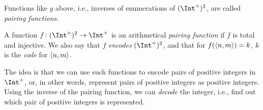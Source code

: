 \documentclass[../../../include/open-logic-section]{subfiles}
\begin{document}
Functions like $g$ above, i.e., inverses of enumerations of $(\Int^+)^2$, are called \emph{pairing functions}.

\begin{defn}
A function $f\colon (\Int^+)^2 \to \Int^+$ is an arithmetical \emph{pairing function} if $f$ is total and injective. We also say that $f$ \emph{encodes} $(\Int^+)^2$, and that for $f(\langle n,m \rangle)=k$, $k$ is the \emph{code} for $\langle n,m \rangle$.
\end{defn}

\begin{explain}
The idea is that we can use such functions to encode pairs of positive integers in $\Int^+$, or, in other words, represent pairs of positive integers as positive integers. Using the inverse of the pairing function, we can \emph{decode} the integer, i.e., find out which pair of positive integers is represented.


\end{explain}
\end{document}
